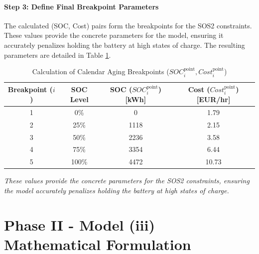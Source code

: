 \documentclass[11pt, a4paper]{article}
\begin{document}
\paragraph{Step 3: Define Final Breakpoint Parameters}
The calculated (SOC, Cost) pairs form the breakpoints for the SOS2 constraints. These values provide the concrete parameters for the model, ensuring it accurately penalizes holding the battery at high states of charge. The resulting parameters are detailed in Table \ref{tab_calendar_costs}.

\begin{table}[h!]
\centering
\caption{Calculation of Calendar Aging Breakpoints ($SOC^{\mathrm{point}}_i, Cost^{\mathrm{point}}_i$)}
\label{tab_calendar_costs}
\begin{tabular}{@{}cccc@{}}
\toprule
\textbf{Breakpoint ($i$)} & \textbf{SOC Level} & \textbf{SOC ($SOC_i^{\mathrm{point}}$) [kWh]} & \textbf{Cost ($Cost_i^{\mathrm{point}}$) [EUR/hr]} \\ \midrule
1 & 0\% & 0 & 1.79 \\
2 & 25\% & 1118 & 2.15 \\
3 & 50\% & 2236 & 3.58 \\
4 & 75\% & 3354 & 6.44 \\
5 & 100\% & 4472 & 10.73 \\ \bottomrule
\end{tabular}
\end{table}
\textit{These values provide the concrete parameters for the SOS2 constraints, ensuring the model accurately penalizes holding the battery at high states of charge.}

\section{Phase II - Model (iii) Mathematical Formulation}
\end{document}

